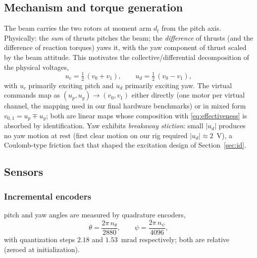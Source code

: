\documentclass[conference]{IEEEtran}
\begin{document}
\subsection{Mechanism and torque generation}\label{sec:mixer}
The beam carries the two rotors at moment arm $d_t$ from the pitch axis. Physically: the \emph{sum} of thrusts pitches the beam; the \emph{difference} of thrusts (and the difference of reaction torques) yaws it, with the yaw component of thrust scaled by the beam attitude. This motivates the collective/differential decomposition of the physical voltages,
\begin{equation}
u_c = \tfrac12\,(v_0 + v_1),\qquad
u_d = \tfrac12\,(v_0 - v_1),
\label{eq:coll_diff}
\end{equation}
with $u_c$ primarily exciting pitch and $u_d$ primarily exciting yaw. The virtual commands map as $(u_p,u_y)\!\to\!(v_0,v_1)$ either directly (one motor per virtual channel, the mapping used in our final hardware benchmarks) or in mixed form $v_{0,1} = u_p \mp u_y$; both are linear maps whose composition with \eqref{eq:effectiveness} is absorbed by identification. Yaw exhibits \emph{breakaway stiction}: small $|u_d|$ produces no yaw motion at rest (first clear motion on our rig required $|u_d|\approx2$~V), a Coulomb-type friction fact that shaped the excitation design of Section~\ref{sec:id}.

\subsection{Sensors}
\subsubsection{Incremental encoders} pitch and yaw angles are measured by quadrature encoders,
\begin{equation}
\theta = \frac{2\pi\,n_\theta}{2880},\qquad
\psi = \frac{2\pi\,n_\psi}{4096},
\end{equation}
with quantization steps $2.18$ and $1.53$~mrad respectively; both are relative (zeroed at initialization).
\end{document}
